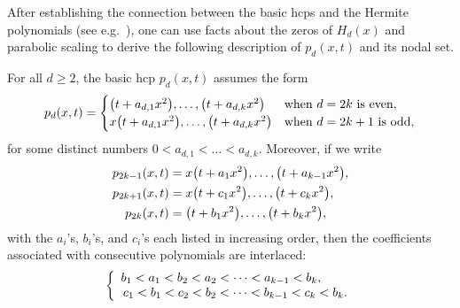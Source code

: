 \documentclass[10pt]{amsart}
\theoremstyle{definition}\newtheorem{defi}[theo]{Definition}\newtheorem{rema}[theo]{Remark}\newtheorem{exam}[theo]{Example}\newtheorem{exem}[theo]{Example}\newtheorem{nota}[theo]{Notation}
\let\originalleft\left
\let\originalright\right
\renewcommand{\left}{\mathopen{}\mathclose\bgroup\originalleft}
\renewcommand{\right}{\aftergroup\egroup\originalright}
\begin{document}
After establishing the connection between the basic hcps and the Hermite polynomials (see e.g.~\cite{Chen98,KPS21,RW59}), one can use facts about the zeros of $H_d(x)$ and parabolic scaling to derive the following description of $p_d(x,t)$ and its nodal set.

\begin{prop}\label{lem:hcp_dim_1}
For all $d\geq 2$, the basic hcp $p_d(x,t)$ assumes the form
\begin{equation}\label{pd-factor}
p_{d}(x,t) =
\begin{cases}
\left(t+a_{d,1}x^2\right),\dots, \left(t+ a_{d,k}x^2\right) &\text{when $d=2k$ is even},\\
x\left(t+a_{d,1}x^2\right),\dots,\left(t+a_{d,k}x^2\right) & \text{when $d=2k+1$ is odd},
\end{cases}
\end{equation}
for some distinct numbers $0<a_{d,1}<\dots<a_{d,k}$. Moreover, if we write
\begin{align*}
p_{2k-1}(x,t)&=x\left(t+a_1x^2\right),\dots,\left(t+a_{k-1}x^2\right),\\ p_{2k+1}(x,t)&=x\left(t+c_1x^2\right),\dots,\left(t+c_kx^2\right),
\\
p_{2k}(x,t)&=\left(t+b_1x^2\right),\dots,\left(t+b_kx^2\right),
\end{align*}
with the $a_i$\!'s, $b_i$\!'s, and $c_i$\!'s each listed in increasing order, then the coefficients associated with consecutive polynomials are interlaced:
\begin{equation}\label{pd-interlace}
\left\{
\begin{array}{l}
b_1<a_1<b_2<a_2<\dots<a_{k-1}<b_k,\\
\,c_1<b_1<c_2<b_2<\dots<b_{k-1}<c_k<b_k.
\end{array}\right.
\end{equation}
\end{prop}
\end{document}
